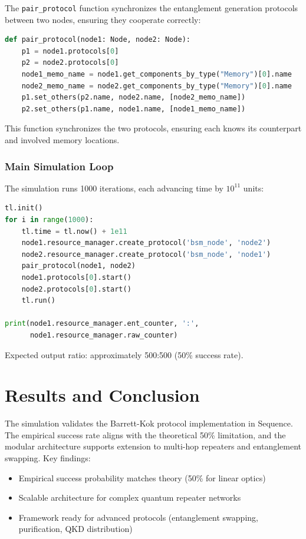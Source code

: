 The \texttt{pair\_protocol} function synchronizes the entanglement generation protocols between two nodes, ensuring they cooperate correctly:

\begin{lstlisting}[language=Python, breaklines=true]
def pair_protocol(node1: Node, node2: Node):
    p1 = node1.protocols[0]
    p2 = node2.protocols[0]
    node1_memo_name = node1.get_components_by_type("Memory")[0].name
    node2_memo_name = node2.get_components_by_type("Memory")[0].name
    p1.set_others(p2.name, node2.name, [node2_memo_name])
    p2.set_others(p1.name, node1.name, [node1_memo_name])
\end{lstlisting}

This function synchronizes the two protocols, ensuring each knows its counterpart and involved memory locations.

\subsubsection{Main Simulation Loop}

The simulation runs 1000 iterations, each advancing time by $10^{11}$ units:

\begin{lstlisting}[language=Python, breaklines=true]
tl.init()
for i in range(1000):
    tl.time = tl.now() + 1e11
    node1.resource_manager.create_protocol('bsm_node', 'node2')
    node2.resource_manager.create_protocol('bsm_node', 'node1')
    pair_protocol(node1, node2)
    node1.protocols[0].start()
    node2.protocols[0].start()
    tl.run()

print(node1.resource_manager.ent_counter, ':', 
      node1.resource_manager.raw_counter)
\end{lstlisting}
Expected output ratio: approximately 500:500 (50\% success rate).

\section{Results and Conclusion}

The simulation validates the Barrett-Kok protocol implementation in Sequence. The empirical success rate aligns with the theoretical 50\% limitation, and the modular architecture supports extension to multi-hop repeaters and entanglement swapping. Key findings:

\begin{itemize}
    \item Empirical success probability matches theory (50\% for linear optics)
    \item Scalable architecture for complex quantum repeater networks
    \item Framework ready for advanced protocols (entanglement swapping, purification, QKD distribution)
\end{itemize}

\newpage




